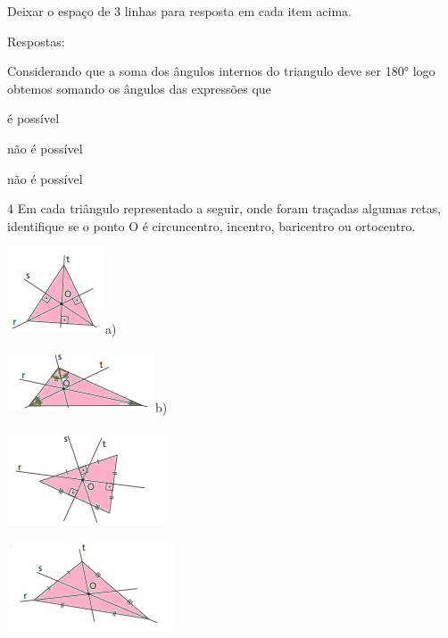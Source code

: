 Deixar o espaço de 3 linhas para resposta em cada item acima.

Respostas:

Considerando que a soma dos ângulos internos do triangulo deve ser 180°
logo obtemos somando os ângulos das expressões que

\item é possível
\item não é possível
\item não é possível

\num{4} Em cada triângulo representado a seguir, onde foram traçadas algumas
retas, identifique se o ponto O é circuncentro, incentro, baricentro ou
ortocentro.

\includegraphics[width=1\times 14583in,height=1\times 01042in]{./imgSAEB_8_MAT/media/image15.png}a)

\includegraphics[width=1\times 72917in,height=0\times 71875in]{./imgSAEB_8_MAT/media/image16.png}b)

\includegraphics[width=1\times 84375in,height=1\times 125in]{./imgSAEB_8_MAT/media/image17.png}

\item 

\includegraphics[width=1\times 9375in,height=1\times 04167in]{./imgSAEB_8_MAT/media/image18.png}

\item 

